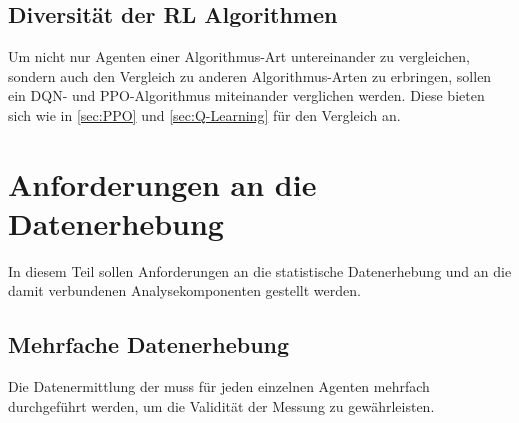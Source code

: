 \subsection{Diversität der RL Algorithmen}
Um nicht nur Agenten einer Algorithmus-Art untereinander zu vergleichen, sondern auch den Vergleich zu anderen Algorithmus-Arten zu erbringen, sollen ein DQN- und PPO-Algorithmus miteinander verglichen werden. Diese bieten sich wie in \ref{sec:PPO} und \ref{sec:Q-Learning} für den Vergleich an.

\section{Anforderungen an die Datenerhebung} \label{sec:Anforderungen_an_die_Datenerhebung}
In diesem Teil sollen Anforderungen an die statistische Datenerhebung und an die damit verbundenen Analysekomponenten gestellt werden.

\subsection{Mehrfache Datenerhebung}
Die Datenermittlung der muss für jeden einzelnen Agenten mehrfach durchgeführt werden, um die Validität der Messung zu gewährleisten.

